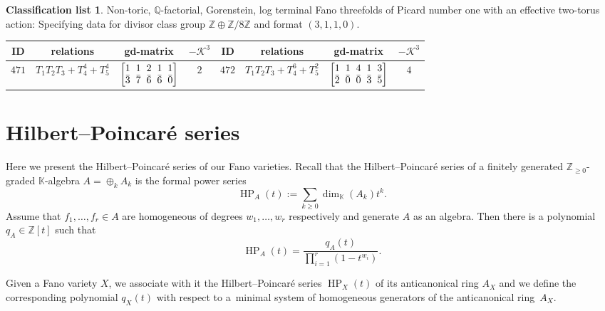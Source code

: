 \documentclass[pdftex]{sigma}%
\theoremstyle{definition}
\newtheorem{class-list}[thm]{Classification list}
\def\KK{{\mathbb K}}
\def\ZZ{{\mathbb Z}}
\def\QQ{{\mathbb Q}}
\DeclareMathOperator\HP{HP}
\numberwithin{equation}{section}
\begin{document}
\begin{class-list}\label{class-list(0,8)}
Non-toric, $\QQ$-factorial, Gorenstein, log terminal Fano
threefolds of Picard number one with an effective two-torus action:
Specifying data for divisor class group $\ZZ\oplus \ZZ/8\ZZ$ and
format $(3,1,1,0)$.
\begin{table}[h!]\centering\setlength{\tabcolsep}{3.5pt}
\renewcommand{\arraystretch}{1.1}\small\tabulinesep=1mm
\begin{tabu}{c|c|c|c||c|c|c|c}
\hline
ID&relations&gd-matrix&$-\mathcal{K}^3$&ID&relations&gd-matrix&$-\mathcal{K}^3$
\\
\hline
${471}$&${T_{1}T_{2}T_{3}+T_{4}^{4}+T_{5}^{4}}$
&$\arraycolsep=1mm\begin{bmatrix}{1} & {1} & {2} & {1} & {1} \\ {\bar{3}} & {\bar{7}} & {\bar{6}} & {\bar{6}} & {\bar{0}}\end{bmatrix}$&${2}$
&${472}$&${T_{1}T_{2}T_{3}+T_{4}^{6}+T_{5}^{2}}$
&$\arraycolsep=1mm\begin{bmatrix}{1} & {1} & {4} & {1} & {3} \\ {\bar{2}} & {\bar{0}} & {\bar{0}} & {\bar{3}} & {\bar{5}}\end{bmatrix}$&${4}$
\\
\hline
\end{tabu}\vspace{-4mm}
\end{table}
\end{class-list}


\section{Hilbert--Poincar\'{e} series}
\label{sec:hilbert-series}

Here we present the Hilbert--Poincar\'{e} series of our
Fano varieties.
Recall that the Hilbert--Poincar\'{e} series of a
finitely generated $\ZZ_{\ge 0}$-graded $\KK$-algebra
$A = \oplus_{k} A_k$ is the formal power series
\[
\HP_A(t) := \sum_{k \ge 0} \dim_\KK(A_k) t^k.
\]
Assume that $f_1,\dots,f_r \in A$ are homogeneous
of degrees $w_1,\dots,w_r$ respectively and generate
$A$ as an algebra.
Then there is a polynomial $q_A \in \ZZ[t]$
such that
\[
\HP_A(t) = \frac{q_A(t)}{\prod_{i=1}^r (1-t^{w_i})}.
\]

Given a Fano variety $X$,
we associate with it the Hilbert--Poincar\'{e}
series $\HP_X(t)$ of its anticanonical ring $A_X$ and
we define the corresponding polynomial $q_X(t)$
with respect to a~minimal system of homogeneous
generators of the anticanonical ring~$A_X$.
\end{document}
